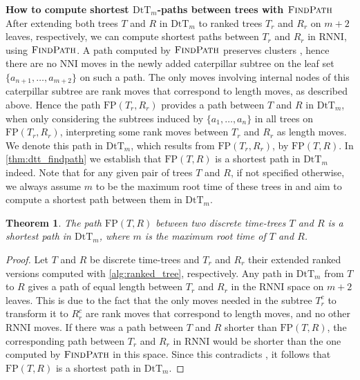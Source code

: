 \documentclass[11pt]{amsart}
\newtheorem{theorem}{Theorem}
\newcommand{\rnni}{\mathrm{RNNI}}
\newcommand{\findpath}{\textsc{FindPath}}
\newcommand{\nni}{\mathrm{NNI}}
\newcommand{\fp}{\mathrm{FP}}
\newcommand{\dtt}{\mathrm{DtT}}
\newcommand{\summary}[1]{\textbf{#1}} %
\begin{document}
\summary{How to compute shortest $\dtt_m$-paths between trees with $\findpath$}
After extending both trees $T$ and $R$ in $\dtt_m$ to ranked trees $T_r$ and $R_r$ on $m+2$ leaves, respectively, we can compute shortest paths between $T_r$ and $R_r$ in $\rnni$, using $\findpath$.
A path computed by $\findpath$ preserves clusters \autocite{Collienne2020-iu}, hence there are no $\nni$ moves in the newly added caterpillar subtree on the leaf set $\{a_{n+1}, \ldots, a_{m+2}\}$ on such a path.
The only moves involving internal nodes of this caterpillar subtree are rank moves that correspond to length moves, as described above.
Hence the path $\fp(T_r,R_r)$ provides a path between $T$ and $R$ in $\dtt_m$, when only considering the subtrees induced by $\{a_1, \ldots, a_n\}$ in all trees on $\fp(T_r, R_r)$, interpreting some rank moves between $T_r$ and $R_r$ as length moves.
We denote this path in $\dtt_m$, which results from $\fp(T_r, R_r)$, by $\fp(T,R)$.
In \autoref{thm:dtt_findpath} we establish that $\fp(T,R)$ is a shortest path in $\dtt_m$ indeed.
Note that for any given pair of trees $T$ and $R$, if not specified otherwise, we always assume $m$ to be the maximum root time of these trees in and aim to compute a shortest path between them in $\dtt_m$. 

\begin{theorem}
	The path $\fp(T,R)$ between two discrete time-trees $T$ and $R$ is a shortest path in $\dtt_m$, where $m$ is the maximum root time of $T$ and $R$.
	\label{thm:dtt_findpath}
\end{theorem}

\begin{proof}
	Let $T$ and $R$ be discrete time-trees and $T_r$ and $R_r$ their extended ranked versions computed with \autoref{alg:ranked_tree}, respectively.
	Any path in $\dtt_m$ from $T$ to $R$ gives a path of equal length between $T_r$ and $R_r$ in the $\rnni$ space on $m+2$ leaves.
	This is due to the fact that the only moves needed in the subtree $T_r^c$ to transform it to $R_r^c$ are rank moves that correspond to length moves, and no other $\rnni$ moves.
	If there was a path between $T$ and $R$ shorter than $\fp(T,R)$, the corresponding path between $T_r$ and $R_r$ in $\rnni$ would be shorter than the one computed by $\findpath$ in this space.
	Since this contradicts \autocite[Theorem 1]{Collienne2020-iu}, it follows that $\fp(T,R)$ is a shortest path in $\dtt_m$.
\end{proof}
\end{document}
